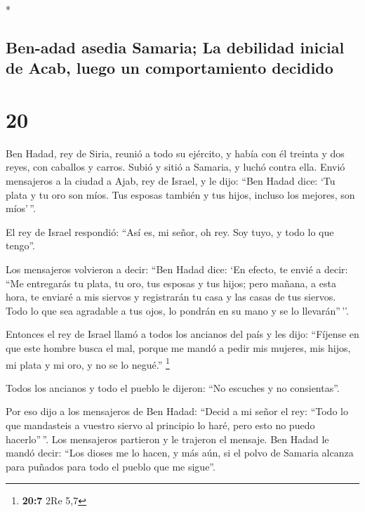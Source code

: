 \begin{paracol}{2}
\begin{otherlanguage}{english}
\end{otherlanguage}

\switchcolumn[0]*

\hypertarget{ben-adad-asedia-samaria-la-debilidad-inicial-de-acab-luego-un-comportamiento-decidido}{%
\subsection{Ben-adad asedia Samaria; La debilidad inicial de Acab, luego
un comportamiento
decidido}\label{ben-adad-asedia-samaria-la-debilidad-inicial-de-acab-luego-un-comportamiento-decidido}}

\hypertarget{section-38}{%
\section{20}\label{section-38}}

 Ben Hadad, rey de Siria, reunió a todo su ejército, y
había con él treinta y dos reyes, con caballos y carros. Subió y sitió a
Samaria, y luchó contra ella.  Envió mensajeros a la
ciudad a Ajab, rey de Israel, y le dijo: ``Ben Hadad dice:
 `Tu plata y tu oro son míos. Tus esposas también y tus
hijos, incluso los mejores, son míos'\,''.

 El rey de Israel respondió: ``Así es, mi señor, oh rey.
Soy tuyo, y todo lo que tengo''.

 Los mensajeros volvieron a decir: ``Ben Hadad dice: `En
efecto, te envié a decir: ``Me entregarás tu plata, tu oro, tus esposas
y tus hijos;  pero mañana, a esta hora, te enviaré a mis
siervos y registrarán tu casa y las casas de tus siervos. Todo lo que
sea agradable a tus ojos, lo pondrán en su mano y se lo llevarán''\,''.

 Entonces el rey de Israel llamó a todos los ancianos del
país y les dijo: ``Fíjense en que este hombre busca el mal, porque me
mandó a pedir mis mujeres, mis hijos, mi plata y mi oro, y no se lo
negué.'' \footnote{\textbf{20:7} 2Re 5,7}

 Todos los ancianos y todo el pueblo le dijeron: ``No
escuches y no consientas''.

 Por eso dijo a los mensajeros de Ben Hadad: ``Decid a mi
señor el rey: ``Todo lo que mandasteis a vuestro siervo al principio lo
haré, pero esto no puedo hacerlo''\,''. Los mensajeros partieron y le
trajeron el mensaje.  Ben Hadad le mandó decir: ``Los
dioses me lo hacen, y más aún, si el polvo de Samaria alcanza para
puñados para todo el pueblo que me sigue''.


\end{paracol}
